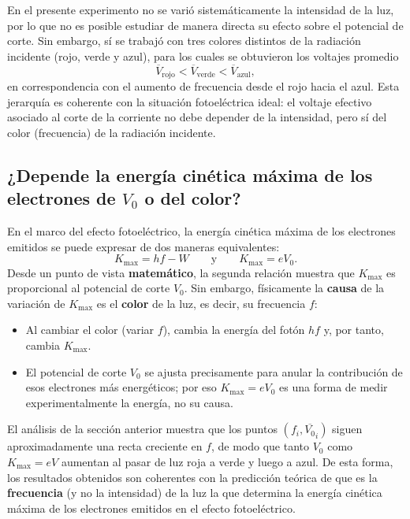 \documentclass[11pt,twocolumn]{article}
\begin{document}
En el presente experimento no se varió sistemáticamente la intensidad
de la luz, por lo que no es posible estudiar de manera directa su
efecto sobre el potencial de corte. Sin embargo, sí se trabajó con
tres colores distintos de la radiación incidente (rojo, verde y
azul), para los cuales se obtuvieron los voltajes promedio
\begin{equation*}
    \overline{V}_{\text{rojo}} < \overline{V}_{\text{verde}} <
    \overline{V}_{\text{azul}},
\end{equation*}
en correspondencia con el aumento de frecuencia desde el rojo hacia
el azul. Esta jerarquía es coherente con la situación fotoeléctrica
ideal: el voltaje efectivo asociado al corte de la corriente no debe
depender de la intensidad, pero sí del color (frecuencia) de
la radiación incidente.

\subsection[¿Depende la energía cinética máxima del potencial de corte o del color?]{¿Depende la energía cinética máxima de los electrones de \texorpdfstring{$V_0$}{V0} o del color?}

En el marco del efecto fotoeléctrico, la energía cinética máxima de
los electrones emitidos se puede expresar de dos maneras equivalentes:
\begin{equation*}
    K_{\max} = hf - W
    \qquad \text{y} \qquad
    K_{\max} = eV_0.
\end{equation*}
Desde un punto de vista \textbf{matemático}, la segunda relación
muestra que $K_{\max}$ es proporcional al potencial de corte $V_0$.
Sin embargo, físicamente la \textbf{causa} de la variación de
$K_{\max}$ es el \textbf{color} de la luz, es decir, su frecuencia
$f$:

\begin{itemize}
  \item Al cambiar el color (variar $f$), cambia la energía del fotón
        $hf$ y, por tanto, cambia $K_{\max}$.
  \item El potencial de corte $V_0$ se ajusta precisamente para
        anular la contribución de esos electrones más energéticos;
        por eso $K_{\max} = eV_0$ es una forma de medir
        experimentalmente la energía, no su causa.
\end{itemize}

El análisis de la sección anterior
muestra que los puntos $(f_i,\overline{V_0}_i)$ siguen aproximadamente
una recta creciente en $f$, de modo que tanto $V_0$ como $K_{\max} =
eV$ aumentan al pasar de luz roja a verde y luego a azul. De esta
forma, los resultados obtenidos son coherentes con la predicción
teórica de que es la \textbf{frecuencia} (y no la intensidad) de la
luz la que determina la energía cinética máxima de los electrones
emitidos en el efecto fotoeléctrico.
\end{document}
